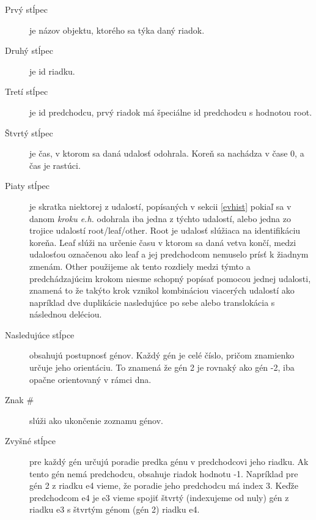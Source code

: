 \begin{description}

\item[Prvý stĺpec] je názov objektu, ktorého sa týka daný riadok.

\item[Druhý stĺpec] je id riadku.

\item[Tretí stĺpec] je id predchodcu, prvý riadok má špeciálne id predchodcu s hodnotou root.

\item[Štvrtý stĺpec] je čas, v ktorom sa daná udalosť odohrala. Koreň sa nachádza v čase 0, a čas je rastúci.

\item[Piaty stĺpec] je skratka niektorej z udalostí, popísaných v sekcii \ref{evhist} pokiaľ sa v danom \emph{kroku e.h.} odohrala iba jedna z týchto udalostí, alebo jedna zo trojice udalostí root/leaf/other.
Root je udalosť slúžiaca na identifikáciu koreňa.
Leaf slúži na určenie času v ktorom sa daná vetva končí, medzi udalosťou označenou ako leaf a jej predchodcom nemuselo prísť k žiadnym zmenám.
Other použijeme ak tento rozdiely medzi týmto a predchádzajúcim krokom niesme schopný popísať pomocou jednej udalosti,
znamená to že takýto krok vznikol kombináciou viacerých udalostí ako napríklad dve duplikácie nasledujúce po sebe alebo translokácia s následnou deléciou.

\item [Nasledujúce stĺpce] obsahujú postupnosť génov. Každý gén je celé číslo, pričom znamienko určuje jeho orientáciu. To znamená že gén 2 je rovnaký ako gén -2, iba opačne orientovaný v rámci dna.

\item [Znak \#] slúži ako ukončenie zoznamu génov.

\item[Zvyšné stĺpce] pre každý gén určujú poradie predka génu v predchodcovi jeho riadku. Ak tento gén nemá predchodcu, obsahuje riadok hodnotu -1.
Napríklad pre gén 2 z riadku e4 vieme, že poradie jeho predchodcu má index 3. Keďže predchodcom e4 je e3 vieme spojiť štvrtý (indexujeme od nuly) gén z riadku e3 s štvrtým génom (gén 2) riadku e4.

\end{description}

